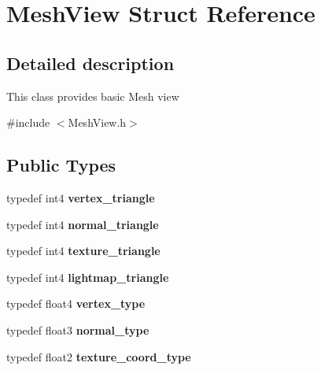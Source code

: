 \hypertarget{struct_mesh_view}{}\section{Mesh\+View Struct Reference}
\label{struct_mesh_view}


\subsection{Detailed description}
This class provides basic Mesh view 

{\ttfamily \#include $<$Mesh\+View.\+h$>$}

\subsection*{Public Types}
\begin{DoxyCompactItemize}
\item 
\mbox{\label{struct_mesh_view_ae8076032b3e9eeb53d2eeb9f2e9cdd01}} 
typedef int4 {\bfseries vertex\+\_\+triangle}
\item 
\mbox{\label{struct_mesh_view_ab6eca703281163bd033394ea3c65754f}} 
typedef int4 {\bfseries normal\+\_\+triangle}
\item 
\mbox{\label{struct_mesh_view_a890976ab989b5ffbd6e7b8d976bab28a}} 
typedef int4 {\bfseries texture\+\_\+triangle}
\item 
\mbox{\label{struct_mesh_view_ae1caf379aba0f7fe439d56de0b2d7845}} 
typedef int4 {\bfseries lightmap\+\_\+triangle}
\item 
\mbox{\label{struct_mesh_view_a9b693b46e9294cbb014f1246b2ea4f9c}} 
typedef float4 {\bfseries vertex\+\_\+type}
\item 
\mbox{\label{struct_mesh_view_acf49dfbcd2c5a98a2094b34ec1270206}} 
typedef float3 {\bfseries normal\+\_\+type}
\item 
\mbox{\label{struct_mesh_view_a4ce8bcdca8b64f83aea010fd510895e0}} 
typedef float2 {\bfseries texture\+\_\+coord\+\_\+type}
\end{DoxyCompactItemize}
